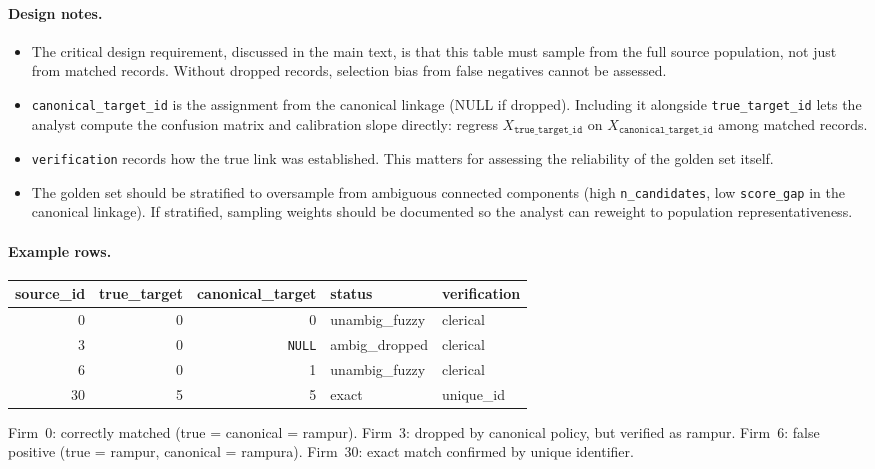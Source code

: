 \documentclass[12pt]{article}
\begin{document}
\paragraph{Design notes.}
\begin{itemize}
    \item The critical design requirement, discussed in the main text, is that this table must sample from the full source population, not just from matched records. Without dropped records, selection bias from false negatives cannot be assessed.
    \item \texttt{canonical\_target\_id} is the assignment from the canonical linkage (NULL if dropped). Including it alongside \texttt{true\_target\_id} lets the analyst compute the confusion matrix and calibration slope directly: regress $X_{\texttt{true\_target\_id}}$ on $X_{\texttt{canonical\_target\_id}}$ among matched records.
    \item \texttt{verification} records how the true link was established. This matters for assessing the reliability of the golden set itself.
    \item The golden set should be stratified to oversample from ambiguous connected components (high \texttt{n\_candidates}, low \texttt{score\_gap} in the canonical linkage). If stratified, sampling weights should be documented so the analyst can reweight to population representativeness.
\end{itemize}

\paragraph{Example rows.}

\begin{center}
\small
\begin{tabular}{rrrll}
\toprule
source\_id & true\_target & canonical\_target & status & verification \\
\midrule
0 & 0 & 0 & unambig\_fuzzy & clerical \\
3 & 0 & \texttt{NULL} & ambig\_dropped & clerical \\
6 & 0 & 1 & unambig\_fuzzy & clerical \\
30 & 5 & 5 & exact & unique\_id \\
\bottomrule
\end{tabular}
\end{center}

Firm~0: correctly matched (true = canonical = rampur). Firm~3: dropped by canonical policy, but verified as rampur. Firm~6: false positive (true = rampur, canonical = rampura). Firm~30: exact match confirmed by unique identifier.
\end{document}
